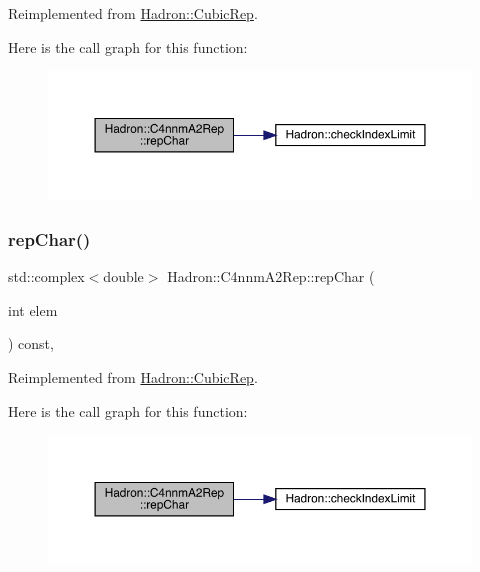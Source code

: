 Reimplemented from \mbox{\hyperlink{structHadron_1_1CubicRep_af45227106e8e715e84b0af69cd3b36f8}{Hadron\+::\+Cubic\+Rep}}.

Here is the call graph for this function\+:
\nopagebreak
\begin{figure}[H]
\begin{center}
\leavevmode
\includegraphics[width=350pt]{d6/d9a/structHadron_1_1C4nnmA2Rep_afb88da7160e06ad4085c5ed34d410bbc_cgraph}
\end{center}
\end{figure}
\mbox{\label{structHadron_1_1C4nnmA2Rep_afb88da7160e06ad4085c5ed34d410bbc}} 
\subsubsection{\texorpdfstring{repChar()}{repChar()}\hspace{0.1cm}{\footnotesize\ttfamily [2/2]}}
{\footnotesize\ttfamily std\+::complex$<$double$>$ Hadron\+::\+C4nnm\+A2\+Rep\+::rep\+Char (\begin{DoxyParamCaption}\item[{int}]{elem }\end{DoxyParamCaption}) const\hspace{0.3cm}{\ttfamily [inline]}, {\ttfamily [virtual]}}



Reimplemented from \mbox{\hyperlink{structHadron_1_1CubicRep_af45227106e8e715e84b0af69cd3b36f8}{Hadron\+::\+Cubic\+Rep}}.

Here is the call graph for this function\+:
\nopagebreak
\begin{figure}[H]
\begin{center}
\leavevmode
\includegraphics[width=350pt]{d6/d9a/structHadron_1_1C4nnmA2Rep_afb88da7160e06ad4085c5ed34d410bbc_cgraph}
\end{center}
\end{figure}
\mbox{\label{structHadron_1_1C4nnmA2Rep_a7c58333a62449bb9badf449950b1828b}} 
